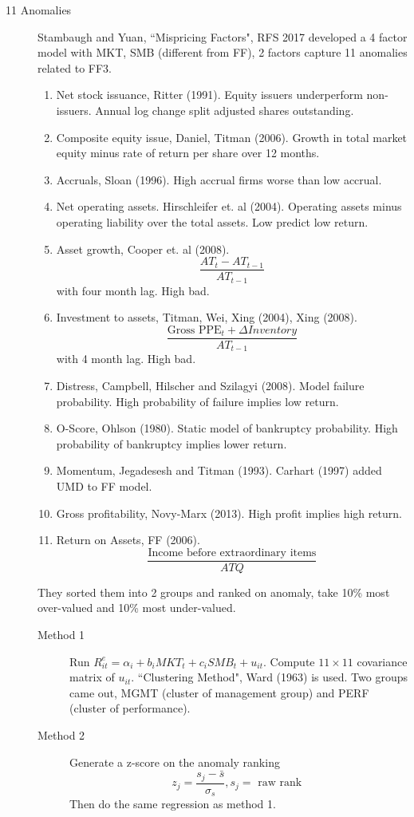 \documentclass[11pt, a4paper, oneside]{article}
\theoremstyle{definition}
\theoremstyle{proposition}
\theoremstyle{corollary}
\theoremstyle{lemma}
\theoremstyle{theorem}
\begin{document}
\begin{description}
\item[11 Anomalies] Stambaugh and Yuan, ``Mispricing Factors", RFS 2017 developed a 4 factor model with MKT, SMB (different from FF), 2 factors capture 11 anomalies related to FF3. 
\begin{enumerate}
\item Net stock issuance, Ritter (1991). Equity issuers underperform non-issuers. Annual log change split adjusted shares outstanding. 
\item Composite equity issue, Daniel, Titman (2006). Growth in total market equity minus rate of return per share over 12 months. 
\item Accruals, Sloan (1996). High accrual firms worse than low accrual. 
\item Net operating assets. Hirschleifer et. al (2004). Operating assets minus operating liability over the total assets. Low predict low return.
\item Asset growth, Cooper et. al (2008). $$\frac{AT_t - AT_{t-1}}{AT_{t-1}}$$ with four month lag. High bad. 
\item Investment to assets, Titman, Wei, Xing (2004), Xing (2008). $$\frac{\text{Gross PPE}_t + \Delta Inventory}{AT_{t-1}}$$ with 4 month lag. High bad. 
\item Distress, Campbell, Hilscher and Szilagyi (2008). Model failure probability. High probability of failure implies low return. 
\item O-Score, Ohlson (1980). Static model of bankruptcy probability. High probability of bankruptcy implies lower return.
\item Momentum, Jegadesesh and Titman (1993). Carhart (1997) added UMD to FF model. 
\item Gross profitability, Novy-Marx (2013). High profit implies high return. 
\item Return on Assets, FF (2006). $$\frac{\text{Income before extraordinary items}}{ATQ}$$ 
\end{enumerate}
They sorted them into 2 groups and ranked on anomaly, take 10\% most over-valued and 10\% most under-valued. 
\begin{description}
\item[Method 1] Run $R^e_{it} = \alpha_i + b_i MKT_t + c_i SMB_t + u_{it}$. Compute $11\times 11$ covariance matrix of $u_{it}$. ``Clustering Method", Ward (1963) is used. Two groups came out, MGMT (cluster of management group) and PERF (cluster of performance). 
\item[Method 2] Generate a z-score on the anomaly ranking $$z_j = \frac{s_j - \bar{s}}{\sigma_s}, s_j =\text{ raw rank }$$ Then do the same regression as method 1. 

\end{description}
\end{description}
\end{document}
